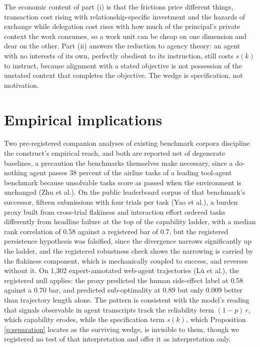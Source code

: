 \documentclass[10pt]{article}
\theoremstyle{remark}
\begin{document}
The economic content of part (i) is that the frictions price different things, transaction cost rising with relationship-specific investment and the hazards of exchange while delegation cost rises with how much of the principal's private context the work consumes, so a work unit can be cheap on one dimension and dear on the other. Part (ii) answers the reduction to agency theory: an agent with no interests of its own, perfectly obedient to its instruction, still costs $s(k)$ to instruct, because alignment with a stated objective is not possession of the unstated context that completes the objective. The wedge is specification, not motivation.

\section{Empirical implications}

Two pre-registered companion analyses of existing benchmark corpora discipline the construct's empirical reach, and both are reported net of degenerate baselines, a precaution the benchmarks themselves make necessary, since a do-nothing agent passes 38 percent of the airline tasks of a leading tool-agent benchmark because unsolvable tasks score as passed when the environment is unchanged (Zhu et al.). On the public leaderboard corpus of that benchmark's successor, fifteen submissions with four trials per task (Yao et al.), a burden proxy built from cross-trial flakiness and interaction effort ordered tasks differently from headline failure at the top of the capability ladder, with a median rank correlation of 0.58 against a registered bar of 0.7, but the registered persistence hypothesis was falsified, since the divergence narrows significantly up the ladder, and the registered robustness check shows the narrowing is carried by the flakiness component, which is mechanically coupled to success, and reverses without it. On 1,302 expert-annotated web-agent trajectories (L\`u et al.), the registered null applies: the proxy predicted the human side-effect label at 0.58 against a 0.70 bar, and predicted sub-optimality at 0.89 but only 0.009 better than trajectory length alone. The pattern is consistent with the model's reading that signals observable in agent transcripts track the reliability term $(1-p)\,r$, which capability erodes, while the specification term $s(k)$, which Proposition \ref{p:separation} locates as the surviving wedge, is invisible to them, though we registered no test of that interpretation and offer it as interpretation only.
\end{document}
